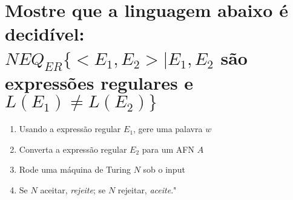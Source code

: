 \section{
    Mostre que a linguagem abaixo é decidível: \\
    \(N E Q_{ER}\{<E_1, E_2> | E_1, E_2 \) são expressões regulares e \( L(E_1) \neq L(E_2) \}\)
    }

\setlength{\parindent}{4em}
\setlength{\parskip}{0.5em}
\renewcommand{\baselinestretch}{1}

\blindtext

\begin{enumerate}    
    \item Usando a expressão regular \(E_1\), gere uma palavra \(w\)

    \item Converta a expressão regular \(E_2\) para um AFN \(A\) 

    \item Rode uma máquina de Turing \(N\) sob o input \(<A, w>\)

    \item Se \(N\) aceitar, \textit{rejeite}; se \(N\) rejeitar, \textit{aceite}."
\end{enumerate}